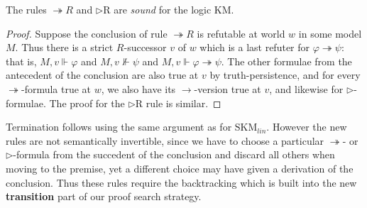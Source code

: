 \documentclass[envcountsect,envcountsame]{llncs}
\newcommand{\forces}{\Vdash}
\newcommand{\iimp}{\twoheadrightarrow}
\newcommand{\lgkm}{\mathrm{KM}}
\newcommand{\limp}{\rightarrow}
\newcommand{\nxt}{\rhd}
\newcommand{\rel}{R}
\newcommand{\seqlcnxt}{\mathrm{SKM}_{lin}}
\newcommand{\newbranchingsteprulename}{\iimp R}
\newcommand{\nxtrightrulename}{\nxt\mathrm{R}}
\begin{document}
\begin{theorem}\label{km-soundness}
  The rules
  $\newbranchingsteprulename$ 
  and
  $\nxtrightrulename$
  are \emph{sound} for the logic
  $\lgkm$. 
\end{theorem}
\begin{proof}
Suppose the conclusion of rule $\newbranchingsteprulename$ 
is refutable at world $w$
in some model $M$. Thus there is a strict $\rel$-successor $v$ of $w$
which is a last refuter for $\varphi\iimp\psi$: that is, $M, v \forces
\varphi$ and $M,v \not\forces \psi$ and
$M,v \forces \varphi\iimp\psi$. The other formulae from the antecedent
of the conclusion are also true at $v$ by truth-persistence,
and for every $\iimp$-formula
true at $w$, we also have its $\limp$-version true at $v$, and likewise for
$\nxt$-formulae.
The proof for the $\nxtrightrulename$ rule is similar.
\end{proof}


Termination follows using the
same argument as for $\seqlcnxt$.
However the new rules are not semantically invertible, since we have to choose
a particular $\iimp$- or $\nxt$-formula from the succedent of the
conclusion and discard all others when moving to the premise, yet a
different choice may have given a derivation of the conclusion. Thus these rules
require the backtracking which is built into the new \textbf{transition}
part of our proof search strategy.
\end{document}
